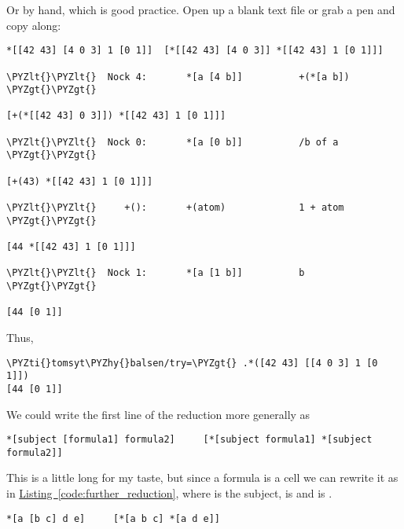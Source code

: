 Or by hand, which is good practice. Open up a blank text file or grab a pen and
copy along:

\begin{framed_shaded}
\begin{Verbatim}[fontsize=\relsize{-2.5},commandchars=\\\{\}]
*[[42 43] [4 0 3] 1 [0 1]]  [*[[42 43] [4 0 3]] *[[42 43] 1 [0 1]]]

\PYZlt{}\PYZlt{}  Nock 4:       *[a [4 b]]          +(*[a b]) \PYZgt{}\PYZgt{}

[+(*[[42 43] 0 3]]) *[[42 43] 1 [0 1]]]

\PYZlt{}\PYZlt{}  Nock 0:       *[a [0 b]]          /b of a  \PYZgt{}\PYZgt{}

[+(43) *[[42 43] 1 [0 1]]]

\PYZlt{}\PYZlt{}     +():       +(atom)             1 + atom  \PYZgt{}\PYZgt{}

[44 *[[42 43] 1 [0 1]]]

\PYZlt{}\PYZlt{}  Nock 1:       *[a [1 b]]          b  \PYZgt{}\PYZgt{}

[44 [0 1]]
\end{Verbatim}
\end{framed_shaded}
Thus,

\begin{framed_shaded}
\begin{Verbatim}[fontsize=\relsize{-2.5},commandchars=\\\{\}]
\PYZti{}tomsyt\PYZhy{}balsen/try=\PYZgt{} .*([42 43] [[4 0 3] 1 [0 1]])
[44 [0 1]]
\end{Verbatim}
\end{framed_shaded}
We could write the first line of the reduction more generally as

\begin{framed_shaded}
\begin{Verbatim}[fontsize=\relsize{-2.5},commandchars=\\\{\}]
*[subject [formula1] formula2]     [*[subject formula1] *[subject formula2]]
\end{Verbatim}
\end{framed_shaded}
This is a little long for my taste, but since a formula is a cell we can
rewrite it as in \hyperref[code:further_reduction]{Listing~\ref{code:further_reduction}}, where  is the subject, \kode{[b c]} is  and \kode{[d e]} is .

\begin{codelisting}
\label{code:further_reduction}
\codecaption{}
\begin{Verbatim}[fontsize=\relsize{-2.5},commandchars=\\\{\}]
*[a [b c] d e]     [*[a b c] *[a d e]]
\end{Verbatim}
\end{codelisting}

